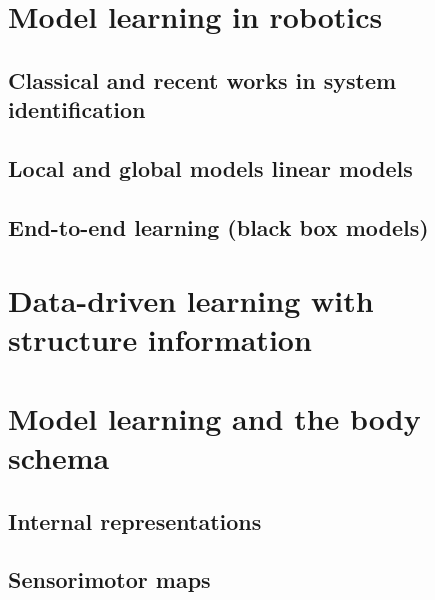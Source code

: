 \section{Model learning in robotics}
\subsection{Classical and recent works in system identification}
\subsection{Local and global models linear models}
\subsection{End-to-end learning (black box models)}
\section{Data-driven learning with structure information}
\section{Model learning and the body schema}
\subsection{Internal representations}
\subsection{Sensorimotor maps}
